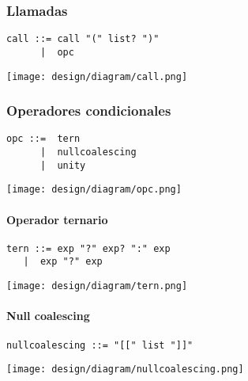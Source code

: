 \subsubsection{Llamadas}
\begin{multicols}{2}
\begin{lstlisting}[style=nonumbers]      
call ::= call "(" list? ")"
      |  opc
\end{lstlisting}  
\columnbreak	
\begin{center}
\texttt{[image: design/diagram/call.png]} 
\end{center}
\end{multicols}

\subsubsection{Operadores condicionales}
\begin{multicols}{2}
\begin{lstlisting}[style=nonumbers]      
opc ::=  tern
      |  nullcoalescing
      |  unity
\end{lstlisting}  
\columnbreak	
\begin{center}
\texttt{[image: design/diagram/opc.png]} 
\end{center}
\end{multicols}
\paragraph{Operador ternario}
\begin{multicols}{2}
\begin{lstlisting}[style=nonumbers]      
tern ::= exp "?" exp? ":" exp
   |  exp "?" exp
\end{lstlisting}  
\columnbreak	
\begin{center}
\texttt{[image: design/diagram/tern.png]} 
\end{center}
\end{multicols}
\paragraph{Null coalescing}
\begin{multicols}{2}
\begin{lstlisting}[style=nonumbers]      
nullcoalescing ::= "[[" list "]]"
\end{lstlisting}  
\columnbreak	
\begin{center}
\texttt{[image: design/diagram/nullcoalescing.png]} 
\end{center}
\end{multicols}

